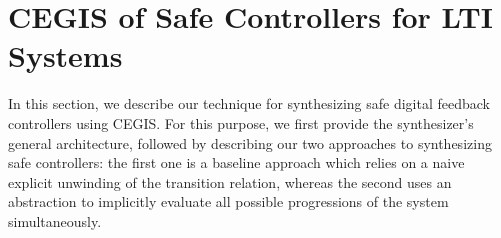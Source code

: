 \documentclass[runningheads,a4paper]{llncs}
\begin{document}
\section{CEGIS of Safe Controllers for LTI Systems} 
\label{sec:CEGARIS} 

In this section, we describe our technique for synthesizing safe
digital feedback controllers using CEGIS.  For this purpose, we first
provide the synthesizer's general architecture, followed by describing
our two approaches to synthesizing safe controllers:
the first one is a baseline approach which relies on a naive explicit
unwinding of the transition relation, whereas the second uses an
abstraction to implicitly evaluate all possible progressions of the
system simultaneously. %

 
\end{document}
